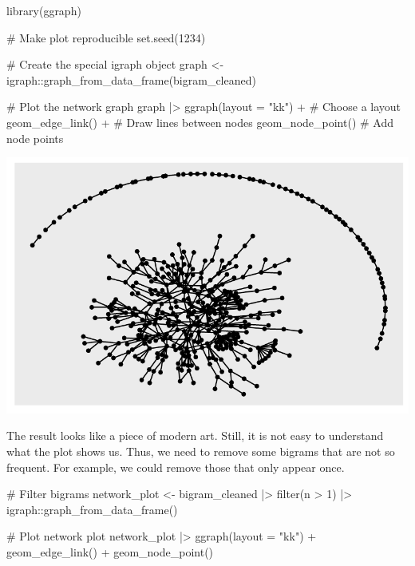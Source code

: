 \documentclass[
  letterpaper,
]{krantz}
\makeatletter
\newenvironment{Shaded}{\begin{snugshade}}{\end{snugshade}}
\newcommand{\AttributeTok}[1]{\textcolor[rgb]{0.40,0.45,0.13}{#1}}
\newcommand{\CommentTok}[1]{\textcolor[rgb]{0.37,0.37,0.37}{#1}}
\newcommand{\DecValTok}[1]{\textcolor[rgb]{0.68,0.00,0.00}{#1}}
\newcommand{\FunctionTok}[1]{\textcolor[rgb]{0.28,0.35,0.67}{#1}}
\newcommand{\NormalTok}[1]{\textcolor[rgb]{0.00,0.23,0.31}{#1}}
\newcommand{\OtherTok}[1]{\textcolor[rgb]{0.00,0.23,0.31}{#1}}
\newcommand{\SpecialCharTok}[1]{\textcolor[rgb]{0.37,0.37,0.37}{#1}}
\newcommand{\StringTok}[1]{\textcolor[rgb]{0.13,0.47,0.30}{#1}}
\newenvironment{kframe}{%
\medskip{}
\setlength{\fboxsep}{.8em}
 \def\at@end@of@kframe{}%
 \ifinner\ifhmode%
  \def\at@end@of@kframe{\end{minipage}}%
  \begin{minipage}{\columnwidth}%
 \fi\fi%
 \def\FrameCommand##1{\hskip\@totalleftmargin \hskip-\fboxsep
 \colorbox{shadecolor}{##1}\hskip-\fboxsep
     \hskip-\linewidth \hskip-\@totalleftmargin \hskip\columnwidth}%
 \MakeFramed {\advance\hsize-\width
   \@totalleftmargin\z@ \linewidth\hsize
   \@setminipage}}%
 {\par\unskip\endMakeFramed%
 \at@end@of@kframe}
\renewenvironment{Shaded}{\begin{kframe}}{\end{kframe}}
\makeatother
\begin{document}
\begin{Shaded}
\begin{Highlighting}[]
\FunctionTok{library}\NormalTok{(ggraph)}

\CommentTok{\# Make plot reproducible}
\FunctionTok{set.seed}\NormalTok{(}\DecValTok{1234}\NormalTok{)}

\CommentTok{\# Create the special igraph object}
\NormalTok{graph }\OtherTok{\textless{}{-}}\NormalTok{ igraph}\SpecialCharTok{::}\FunctionTok{graph\_from\_data\_frame}\NormalTok{(bigram\_cleaned)}

\CommentTok{\# Plot the network graph}
\NormalTok{graph }\SpecialCharTok{|\textgreater{}}
  \FunctionTok{ggraph}\NormalTok{(}\AttributeTok{layout =} \StringTok{"kk"}\NormalTok{) }\SpecialCharTok{+}  \CommentTok{\# Choose a layout}
  \FunctionTok{geom\_edge\_link}\NormalTok{() }\SpecialCharTok{+}       \CommentTok{\# Draw lines between nodes}
  \FunctionTok{geom\_node\_point}\NormalTok{()        }\CommentTok{\# Add node points}
\end{Highlighting}
\end{Shaded}

\includegraphics{14_mixed_methods_files/figure-pdf/ngrams-network-plot-step-one-1.pdf}

The result looks like a piece of modern art. Still, it is not easy to
understand what the plot shows us. Thus, we need to remove some bigrams
that are not so frequent. For example, we could remove those that only
appear once.

\begin{Shaded}
\begin{Highlighting}[]
\CommentTok{\# Filter bigrams}
\NormalTok{network\_plot }\OtherTok{\textless{}{-}}\NormalTok{ bigram\_cleaned }\SpecialCharTok{|\textgreater{}}
  \FunctionTok{filter}\NormalTok{(n }\SpecialCharTok{\textgreater{}} \DecValTok{1}\NormalTok{) }\SpecialCharTok{|\textgreater{}}
\NormalTok{  igraph}\SpecialCharTok{::}\FunctionTok{graph\_from\_data\_frame}\NormalTok{()}

\CommentTok{\# Plot network plot}
\NormalTok{network\_plot }\SpecialCharTok{|\textgreater{}}
  \FunctionTok{ggraph}\NormalTok{(}\AttributeTok{layout =} \StringTok{"kk"}\NormalTok{) }\SpecialCharTok{+}
  \FunctionTok{geom\_edge\_link}\NormalTok{() }\SpecialCharTok{+}
  \FunctionTok{geom\_node\_point}\NormalTok{()}
\end{Highlighting}
\end{Shaded}
\end{document}
